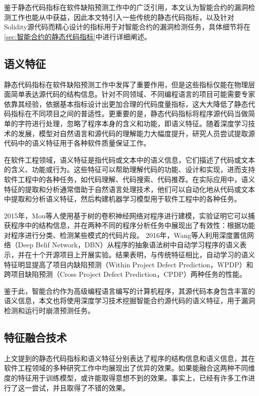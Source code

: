 鉴于静态代码指标在软件缺陷预测工作中的广泛引用，本文认为智能合约的漏洞检测工作也能从中获益，因此本文特引入一些传统的静态代码指标，以及针对Solidity源代码而精心设计的指标用于对智能合约的漏洞检测任务，具体细节将在\autoref{sec:智能合约的静态代码指标}中进行详细阐述。
\subsection{语义特征}
静态代码指标在软件缺陷预测工作中发挥了重要作用，但是这些指标仅能在物理层面简单表达源代码的结构信息。针对不同领域、不同编程语言的项目可能需要专家依靠其经验，依据基本指标设计出更加合理的代码度量指标，这大大降低了静态代码指标在不同项目之间的普适性。更重要的是，静态代码指标将程序源代码当做简单的字符进行处理，忽略了程序本身的含义和功能，即语义特征。随着深度学习技术的发展，模型对自然语言和源代码的理解能力大幅度提升，研究人员尝试提取源代码中的语义特征用于各种软件质量保证工作。

在软件工程领域，语义特征是指代码或文本中的语义信息，它们描述了代码或文本的含义、功能或行为。这些特征可以帮助理解代码的功能、设计和实现，进而支持软件工程中的各种任务，如代码理解、代码搜索、代码推荐。在实际应用中，语义特征的提取和分析通常借助于自然语言处理技术，他们可以自动化地从代码或文本中提取和分析语义特征，然后构建机器学习模型用于软件工程中的各种任务。

2015年，Mou等人\cite{mou2015convolutional}使用基于树的卷积神经网络对程序进行建模，实验证明它可以捕获程序中的结构信息，并在两种不同的程序分析任务中展现出了有效性：根据功能对程序进行分类、检测某些模式的代码片段。
2016年，Wang等人\cite{semantic2016}利用深度置信网络（Deep Belif Network，DBN）从程序的抽象语法树中自动学习程序的语义表示，并在十个开源项目上开展实验。结果表明，与传统特征相比，自动学习的语义特征明显提高了项目内缺陷预测（Within Project Defect Prediction，WPDP）和跨项目缺陷预测（Cross Project Defect Prediction，CPDP）两种任务的性能。

鉴于此，智能合约作为高级编程语言编写的计算机程序，其源代码本身包含丰富的语义信息，本文也将使用深度学习技术挖掘智能合约源代码的语义特征，用于漏洞检测和运行时崩溃预测任务。

\subsection{特征融合技术}
上文提到的静态代码指标和语义特征分别表达了程序的结构信息和语义信息，其在软件工程领域的多种研究工作中均展现出了优异的效果。如果能融合这两种不同维度的特征用于训练模型，或许能取得意想不到的效果。事实上，已经有许多工作进行了这一尝试，并且取得了不错的效果。

